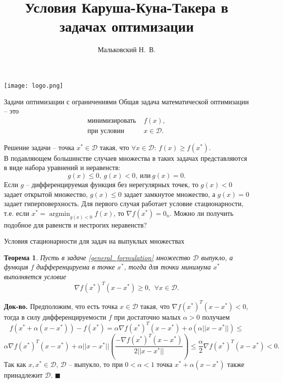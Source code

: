 \documentclass[10pt]{beamer}
\author{Мальковский Н.~В.}
\title[Условия ККТ]{Условия Каруша-Куна-Такера в задачах оптимизации}
\date{}
\institute[СПбАУ]{Санкт-Петербургский Академический  Университет}
\DeclareMathOperator{\argmin}{argmin}
\newtheorem{theorem_ru}{Теорема}[]
\begin{document}
\begin{frame}
\titlepage
\centering
\texttt{[image: logo.png]}
\end{frame}


\begin{frame}{Задачи оптимизации с ограничениями}
Общая задача математической оптимизации -- это
\begin{equation}\label{general_formulation}
\begin{array}{ll}
\mbox{минимизировать } & f(x),\\
\mbox{при условии } & x\in \mathcal{D}.
\end{array}
\end{equation}

Решение задачи -- точка $x^*\in \mathcal{D}$ такая, что $\forall x\in \mathcal{D}:~f(x)\geq f(x^*)$. \\
\pause
\vspace{1em}
В подавляющем большинстве случаев множества в таких задачах представляются в виде набора уравнений и неравенств:
$$
g(x)\leq 0,~g(x)<0, ~\mbox{или} ~g(x)=0.
$$
\pause
Если $g$ -- дифференцируемая функция без нерегулярных точек, то $g(x)<0$ задает открытой множество, $g(x)\leq 0$ задает замкнутое множество, а $g(x)=0$ задает гиперповерхность. Для первого случая работает условие стационарности, т.е. если $x^*=\argmin_{g(x)<0}f(x)$, то $\nabla f(x^*)=0_n$. Можно ли получить подобное для равенств и нестрогих неравенств?
\end{frame}

\begin{frame}{Условия стационарности для задач на выпуклых множествах}
\begin{theorem_ru}
Пусть в задаче \eqref{general_formulation} множество $\mathcal{D}$ выпукло, а функция $f$ дифференцируема в точке $x^*$, тогда для точки минимума $x^*$ выполняется условие
$$
\nabla f(x^*)^T(x-x^*)\geq 0,~~\forall x\in \mathcal{D}.
$$
\end{theorem_ru}
\pause
\textbf{Док-во.} Предположим, что есть точка $x\in\mathcal{D}$ такая, что $\nabla f(x^*)^T(x-x^*)<0$, тогда в силу дифференцируемости $f$ при достаточно малых $\alpha>0$ получаем
$$
f(x^*+\alpha (x-x^*))-f(x^*)=\alpha\nabla f(x^*)^T(x-x^*)+o(\alpha||x-x^*||)\leq
$$
$$
 \alpha \nabla f(x^*)^T(x-x^*)+\alpha ||x-x^*||\left(\frac{-\nabla f(x^*)^T(x-x^*)}{2||x-x^*||}\right)\leq \frac{\alpha}{2}\nabla f(x^*)^T(x-x^*)<0.
$$
Так как $x, x^*\in\mathcal{D}$, $\mathcal{D}$ -- выпукло, то при $0<\alpha<1$ точка $x^*+\alpha(x-x^*)$ также принадлежит $\mathcal{D}$. $\blacksquare$  

\end{frame}
\end{document}
